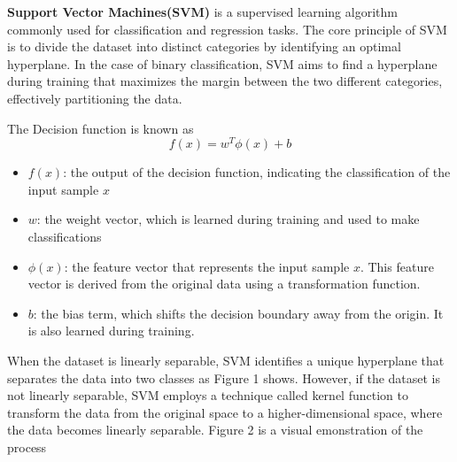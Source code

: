 \documentclass[a4paper]{article}
\begin{document}
\textbf{Support Vector Machines(SVM)} is a supervised learning algorithm commonly used for classification and regression tasks. The core principle of SVM is to divide the dataset into distinct categories by identifying an optimal hyperplane. In the case of binary classification, SVM aims to find a hyperplane during training that maximizes the margin between the two different categories, effectively partitioning the data.

The Decision function is known as$$f(x) = w^T \phi(x) + b$$
\begin{itemize}
    \item $f(x)$: the output of the decision function, indicating the classification of the input sample $x$
    \item $w$: the weight vector, which is learned during training and used to make classifications
    \item $\phi(x)$: the feature vector that represents the input sample $x$. This feature vector is derived from the original data using a transformation function.
    \item $b$: the bias term, which shifts the decision boundary away from the origin. It is also learned during training.
\end{itemize}

When the dataset is linearly separable, SVM identifies a unique hyperplane that separates the data into two classes as Figure 1 shows. However, if the dataset is not linearly separable, SVM employs a technique called kernel function to transform the data from the original space to a higher-dimensional space, where the data becomes linearly separable.\cite{ref_svm1} Figure 2 is a visual emonstration of the process
\end{document}
